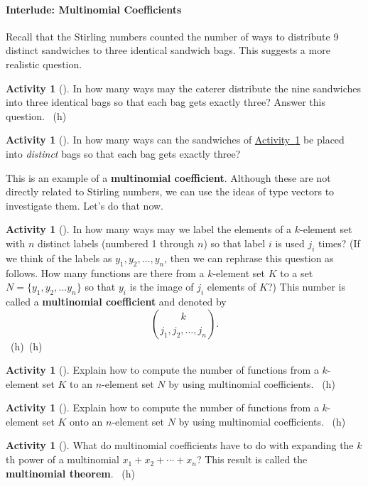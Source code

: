 \documentclass[10pt,]{book}
\newcommand{\terminology}[1]{\textbf{#1}}
\theoremstyle{plain}
\theoremstyle{definition}
\theoremstyle{definition}
\theoremstyle{definition}
\newtheorem{activity}[project]{Activity}
\numberwithin{equation}{chapter}
\begin{document}
\paragraph[{Interlude: Multinomial Coefficients}]{Interlude: Multinomial Coefficients}\hypertarget{pars-multinomial}{}
\hypertarget{p-1419}{}%
Recall that the Stirling numbers counted the number of ways to distribute 9 distinct sandwiches to three identical sandwich bags.  This suggests a more realistic question.%
\begin{activity}[]\label{caterer2}
\hypertarget{p-1420}{}%
In how many ways may the caterer distribute the nine sandwiches into three identical bags so that each bag gets exactly three? Answer this question.%
~{\tiny (h)}\end{activity}
\begin{activity}[]\label{activity-273}
\hypertarget{p-1423}{}%
In how many ways can the sandwiches of \hyperref[caterer2]{Activity~\ref{caterer2}} be placed into \emph{distinct} bags so that each bag gets exactly three?%
\end{activity}
\hypertarget{p-1426}{}%
This is an example of a \terminology{multinomial coefficient}.  Although these are not directly related to Stirling numbers, we can use the ideas of type vectors to investigate them.  Let's do that now.%
\begin{activity}[]\label{activity-274}
\hypertarget{p-1427}{}%
In how many ways may we label the elements of a \(k\)-element set with \(n\) distinct labels (numbered 1 through \(n\)) so that label \(i\) is used \(j_i\) times? (If we think of the labels as \(y_1, y_2, \ldots, y_n\), then we can rephrase this question as follows.  How many functions are there from a \(k\)-element set \(K\) to a set \(N=\{y_1,y_2,\ldots y_n\}\) so that \(y_i\) is the image of \(j_i\) elements of \(K\)?) This number is called a \terminology{multinomial coefficient} and denoted by%
\begin{equation*}
\binom{k}{j_1,j_2,\ldots, j_n}.
\end{equation*}
%
~{\tiny (h)}~{\tiny (h)}\end{activity}
\begin{activity}[]\label{activity-275}
\hypertarget{p-1431}{}%
Explain how to compute the number of functions from a \(k\)-element set \(K\) to an \(n\)-element set \(N\) by using multinomial coefficients.%
~{\tiny (h)}\end{activity}
\begin{activity}[]\label{activity-276}
\hypertarget{p-1434}{}%
Explain how to compute the number of functions from a \(k\)-element set \(K\) onto an \(n\)-element set \(N\) by using multinomial coefficients.%
~{\tiny (h)}\end{activity}
\begin{activity}[]\label{activity-277}
\hypertarget{p-1437}{}%
What do multinomial coefficients have to do with expanding the \(k\)th power of a multinomial \(x_1+x_2+\cdots+x_n\)? This result is called the \terminology{multinomial theorem}.%
~{\tiny (h)}\end{activity}
\typeout{************************************************}
\typeout{************************************************}
\end{document}
